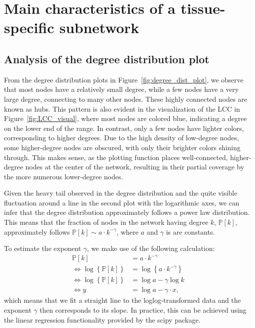 \documentclass[paper=a4,fontsize=11pt,DIV=8,BCOR=5mm,oneside,pdftex,bibtotocnumbered]{scrreprt}
\theoremstyle{plain}
\begin{document}
	\chapter{Main characteristics of a tissue-specific subnetwork}\label{ch:main_ana_tissue}
	\section{Analysis of the degree distribution plot} 
	From the degree distribution plots in Figure~\ref{fig:degree_dist_plot}, we observe that most nodes have a relatively small degree, while a few nodes have a very large degree, connecting to many other nodes. These highly connected nodes are known as hubs. This pattern is also evident in the visualization of the LCC in Figure~\ref{fig:LCC_visual}, where most nodes are colored blue, indicating a degree on the lower end of the range. In contrast, only a few nodes have lighter colors, corresponding to higher degrees. Due to the high density of low-degree nodes, some higher-degree nodes are obscured, with only their brighter colors shining through. This makes sense, as the plotting function places well-connected, higher-degree nodes at the center of the network, resulting in their partial coverage by the more numerous lower-degree nodes.
	
	Given the heavy tail observed in the degree distribution and the quite visible fluctuation around a line in the second plot with the logarithmic axes, we can infer that the degree distribution approximately follows a power law distribution. This means that the fraction of nodes in the network having degree $k$, $\mathbb{P}[k]$, approximately follows $\mathbb{P}[k] \sim a \cdot k^{-\gamma}$, where $a$ and $\gamma$ is are constants.
	
	To estimate the exponent $\gamma$, we make use of the following calculation:
	\[
	\begin{aligned}
		\mathbb{P}[k] &= a \cdot k^{-\gamma} \\
		\Longleftrightarrow \log{\left\{\mathbb{P}[k]\right\}} &= \log{\left\{a \cdot k^{-\gamma}\right\}} \\
		\Longleftrightarrow \log{\left\{\mathbb{P}[k]\right\}} &= \log{a} - \gamma \log{k} \\
		\Longleftrightarrow y &= \log{a} - \gamma \cdot x,
	\end{aligned}
	\]
	which means that we fit a straight line to the loglog-transformed data and the exponent $\gamma$ then corresponds to its slope. In practice, this can be achieved using the linear regression functionality provided by the scipy package.
	
\end{document}
